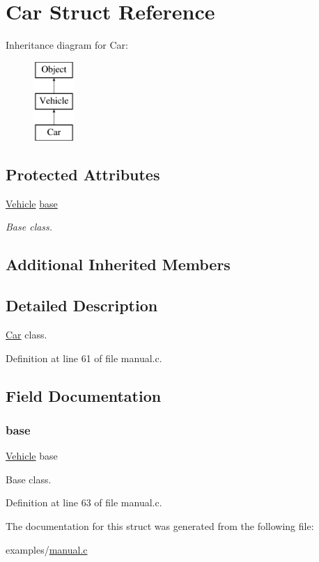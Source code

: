 \hypertarget{struct_car}{}\section{Car Struct Reference}
\label{struct_car}
Inheritance diagram for Car\+:\begin{figure}[H]
\begin{center}
\leavevmode
\includegraphics[height=3.000000cm]{struct_car}
\end{center}
\end{figure}
\subsection*{Protected Attributes}
\begin{DoxyCompactItemize}
\item 
\hyperlink{struct_vehicle}{Vehicle} \hyperlink{struct_car_aea78492ff0e6add272aedd448bf00b6c}{base}
\begin{DoxyCompactList}\small\item\em Base class. \end{DoxyCompactList}\end{DoxyCompactItemize}
\subsection*{Additional Inherited Members}


\subsection{Detailed Description}
\hyperlink{struct_car}{Car} class. 

Definition at line 61 of file manual.\+c.



\subsection{Field Documentation}
\mbox{\label{struct_car_aea78492ff0e6add272aedd448bf00b6c}} 
\subsubsection{\texorpdfstring{base}{base}}
{\footnotesize\ttfamily \hyperlink{struct_vehicle}{Vehicle} base\hspace{0.3cm}{\ttfamily [protected]}}



Base class. 



Definition at line 63 of file manual.\+c.



The documentation for this struct was generated from the following file\+:\begin{DoxyCompactItemize}
\item 
examples/\hyperlink{manual_8c}{manual.\+c}\end{DoxyCompactItemize}

